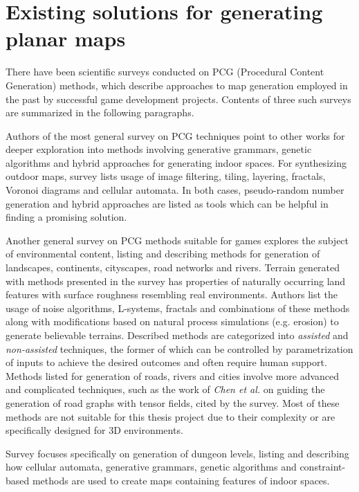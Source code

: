 \documentclass[12pt]{report}
\begin{document}
\section{Existing solutions for generating planar maps}

There have been scientific surveys conducted on PCG (Procedural Content Generation) methods, which describe approaches to map generation employed in the past by successful game development projects. Contents of three such surveys are summarized in the following paragraphs.

Authors of the most general survey on PCG techniques \autocite{hendrikx2013procedural} point to other works for deeper exploration into methods involving generative grammars, genetic algorithms and hybrid approaches for generating indoor spaces. For synthesizing outdoor maps, survey lists usage of image filtering, tiling, layering, fractals, Voronoi diagrams and cellular automata. In both cases, pseudo-random number generation and hybrid approaches are listed as tools which can be helpful in finding a promising solution. 

Another general survey on PCG methods suitable for games \autocite{de2011survey} explores the subject of environmental content, listing and describing methods for generation of landscapes, continents, cityscapes, road networks and rivers. Terrain generated with methods presented in the survey has properties of naturally occurring land features with surface roughness resembling real environments. Authors list the usage of noise algorithms, L-systems, fractals and combinations of these methods along with modifications based on natural process simulations (e.g. erosion) to generate believable terrains. Described methods are categorized into \textit{assisted} and \textit{non-assisted} techniques, the former of which can be controlled by parametrization of inputs to achieve the desired outcomes and often require human support. Methods listed for generation of roads, rivers and cities involve more advanced and complicated techniques, such as the work of \textit{Chen et al.} \autocite{Chen:2008:IPS:1360612.1360702} on guiding the generation of road graphs with tensor fields, cited by the survey. Most of these methods are not suitable for this thesis project due to their complexity or are specifically designed for 3D environments.

Survey \autocite{van2014procedural} focuses specifically on generation of dungeon levels, listing and describing how cellular automata, generative grammars, genetic algorithms and constraint-based methods are used to create maps containing features of indoor spaces.
\end{document}
